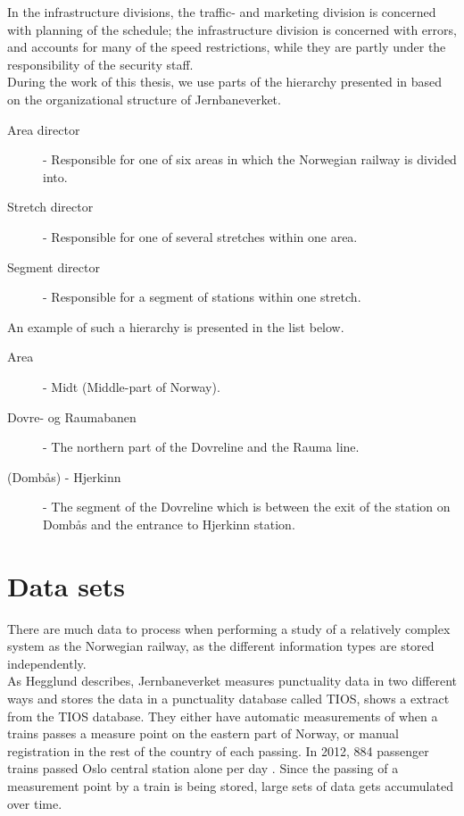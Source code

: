 In the infrastructure divisions, the traffic- and marketing division is
concerned with planning of the schedule; the infrastructure division is
concerned with errors, and accounts for many of the speed restrictions, while
they are partly under the responsibility of the security staff.\\


During the work of this thesis, we use parts of the hierarchy presented in 
 based on the organizational structure of Jernbaneverket.
\begin{description}
	\item [Area director] - Responsible for one of six areas in which the 
	Norwegian railway is divided into.
	\item [Stretch director] - Responsible for one of several stretches within 
	one area.
	\item [Segment director] - Responsible for a segment of stations within one stretch.
\end{description}

\bigskip\bigskip\bigskip
An example of such a hierarchy is presented in the list below.

\begin{description}
	\item [Area] - Midt (Middle-part of Norway).
	\item [Dovre- og Raumabanen] - The northern part of the Dovreline and the
	Rauma line.
	\item [(Dombås) - Hjerkinn] - The segment of the Dovreline which is 
	between the exit of the station on Dombås and the entrance to Hjerkinn
	station.
\end{description}


\section{Data sets} %
\label{sec:back_data_sets}
There are much data to process when performing a study of a relatively complex 
system as the Norwegian railway, as the different information types are stored
independently.\\

As Hegglund\cite[pp. 10-11]{hegglundPunklighetsdataIJernbanetraffik} describes,
Jernbaneverket measures punctuality data in two different ways and stores the
data in a punctuality database called TIOS,  shows a extract from the TIOS database. They either have automatic measurements of when a 
trains passes a measure point on the eastern part of Norway, or manual 
registration in the rest of the country of each passing. In 2012,  884 passenger trains passed Oslo central station alone per day \cite[p. 12]{jernbaneverketStatistikk}.
Since the passing of a measurement point by a train is being stored, large sets
of data gets accumulated over time.

